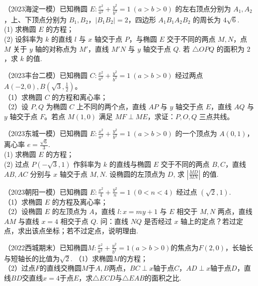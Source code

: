 \begin{exercise} %
（2023海淀一模）已知椭圆 $E:\frac{x^{2}}{a^{2}}+\frac{y^{2}}{b^{2}}=1\ (a>b>0)$ 的左右顶点分别为 $A_{1},A_{2}$，上、下顶点分别为 $B_{1},B_{2}$，$|B_{1}B_{2}|=2$，四边形 $A_{1}B_{1}A_{2}B_{2}$ 的周长为 $4\sqrt{6}$.\\
(1) 求椭圆 $E$ 的方程；\\
(2) 设斜率为 $k$ 的直线 $l$ 与 $x$ 轴交于点 $P$，与椭圆 $E$ 交于不同的两点 $M,N$，点 $M$ 关于 $y$ 轴的对称点为 $M'$，直线 $M'N$ 与 $y$ 轴交于点 $Q$. 若 $\triangle OPQ$ 的面积为 $2$，求 $k$ 的值.
\end{exercise}

\begin{exercise} %
（2023丰台二模）已知椭圆 $C:\frac{x^2}{a^2}+\frac{y^2}{b^2}=1\ (a>b>0)$ 经过两点 $A(-2,0),B\left(\sqrt{3},\frac{1}{2}\right)$。\\
（1）求椭圆 $C$ 的方程和离心率；\\
（2）设 $P,Q$ 为椭圆 $C$ 上不同的两个点，直线 $AP$ 与 $y$ 轴交于点 $E$，直线 $AQ$ 与 $y$ 轴交于点 $F$。若点 $M(1,0)$ 满足 $MF\perp ME$，求证：$P,O,Q$ 三点共线。
\end{exercise}

\begin{exercise} %
（2023东城一模）已知椭圆 $E:\frac{x^{2}}{a^{2}}+\frac{y^{2}}{b^{2}}=1\ (a>b>0)$ 的一个顶点为 $A(0,1)$，离心率 $e=\frac{\sqrt{6}}{3}$.\\
(1) 求椭圆 $E$ 的方程；\\
(2) 过点 $P\left(-\sqrt{3},1\right)$ 作斜率为 $k$ 的直线与椭圆 $E$ 交于不同的两点 $B,C$，直线 $AB,AC$ 分别与 $x$ 轴交于点 $M,N$. 设椭圆的左顶点为 $D$, 求 $\left|\frac{MD}{MN}\right|$ 的值.
\end{exercise}

\begin{exercise} %
（2023朝阳一模）已知椭圆 $E:\frac{x^2}{4}+\frac{y^2}{n}=1\ (0<n<4)$ 经过点 $(\sqrt{2},1)$.\\
（1）求椭圆 $E$ 的方程及离心率；\\
（2）设椭圆 $E$ 的左顶点为 $A$，直线 $l:x=my+1$ 与 $E$ 相交于 $M,N$ 两点，直线 $AM$ 与直线 $x=4$ 相交于点 $Q$. 问：直线 $NQ$ 是否经过 $x$ 轴上的定点？若过定点，求出该点坐标；若不过定点，说明理由.
\end{exercise}

\begin{exercise} %
（2022西城期末）已知椭圆$M: \frac{x^2}{a^2} + \frac{y^2}{b^2} = 1(a > b > 0)$的焦点为$F(2, 0)$，长轴长与短轴长的比值为$\sqrt{2}$.
（1）求椭圆$M$的方程；\\
（2）过点$F$的直线交椭圆$M$于$A, B$两点，$BC \perp x$轴于点$C$，$AD \perp x$轴于点$D$，直线$BD$交直线$x = 4$于点$E$，求$\triangle ECD$与$\triangle EAB$的面积之比.
\end{exercise}

